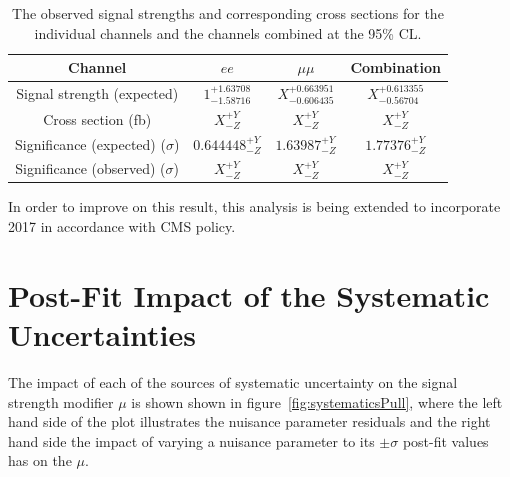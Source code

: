 \begin{table}[!h]
   \centering
   \caption{The observed signal strengths and corresponding cross sections for
   the individual channels and the channels combined at the 95\% CL.}
   \begin{tabular}{cccc}
       \hline
       Channel & $ee$ & $\mu\mu$ & \textbf{Combination} \\
        \hline
       Signal strength (expected) & $1_{-1.58716}^{+1.63708}$ & $X_{-0.606435}^{+0.663951}$ & $X_{-0.56704}^{+0.613355}$ \\
       Cross section (fb) & $X_{-Z}^{+Y}$ & $X_{-Z}^{+Y}$ & $X_{-Z}^{+Y}$ \\
       Significance (expected) ($\sigma$) & $0.644448_{-Z}^{+Y}$ & $1.63987_{-Z}^{+Y}$ & $1.77376_{-Z}^{+Y}$ \\
       Significance (observed) ($\sigma$) & $X_{-Z}^{+Y}$ & $X_{-Z}^{+Y}$ & $X_{-Z}^{+Y}$ \\
    \end{tabular}
   \label{tab:shapetxs}
\end{table}

In order to improve on this result, this analysis is being extended to incorporate 2017 in accordance with CMS policy.

\section{Post-Fit Impact of the Systematic Uncertainties}\label{sec:uncertainitiesImpact}
The impact of each of the sources of systematic uncertainty on the signal strength modifier $\mu$ is shown shown in figure~\ref{fig:systematicsPull}, where the left hand side of the plot illustrates the nuisance parameter residuals and the right hand side the impact of varying a nuisance parameter to its $\pm \sigma$ post-fit values has on the $\mu$.

%

%

